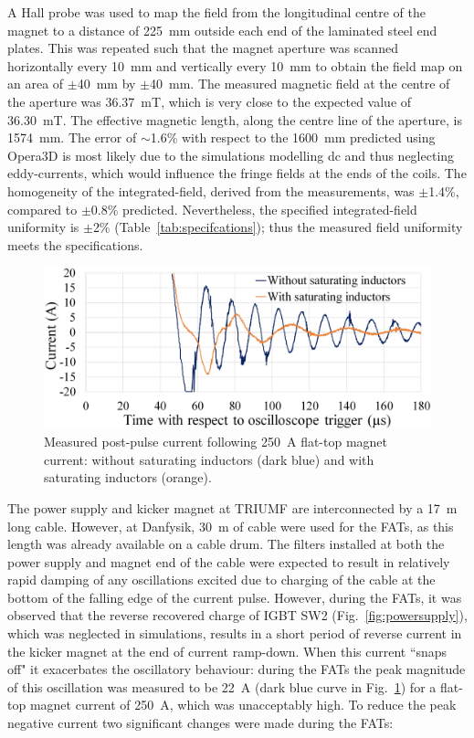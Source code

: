 \documentclass[aps,prab,twocolumn,superscriptaddress]{revtex4-1}
\begin{document}
A Hall probe was used to map the field from the longitudinal centre of the magnet to a distance of 225~mm outside each end of the laminated steel end plates. This was repeated such that the magnet aperture was scanned horizontally every 10~mm and vertically every 10~mm to obtain the field map on an area of $\pm$40~mm  by $\pm$40~mm. The measured magnetic field at the centre of the aperture was 36.37~mT, which is very close to the expected value of 36.30~mT. The effective magnetic length, along the centre line of the aperture, is 1574~mm. The error of $\sim$1.6\% with respect to the 1600~mm predicted using Opera3D is most likely due to the simulations modelling dc and thus neglecting eddy-currents, which would influence the fringe fields at the ends of the coils.
The homogeneity of the integrated-field, derived from the measurements, was $\pm$1.4\%, compared to $\pm$0.8\% predicted. Nevertheless, the specified integrated-field uniformity is $\pm$2\% (Table~\ref{tab:specifcations}); thus the measured field uniformity meets the specifications. 

\begin{figure}[b]
	\includegraphics[width=\linewidth]{initial-undershoot-smaller.png} %
	\caption{Measured post-pulse current following 250~A flat-top magnet current: without saturating inductors (dark blue) and with saturating inductors (orange).}
	\label{fig:initialundershoot}
\end{figure}
The power supply and kicker magnet at TRIUMF are interconnected by a 17~m long cable. However, at Danfysik, 30~m of cable were used for the FATs, as this length was already available on a cable drum. The filters installed at both the power supply and magnet end of the cable were expected to result in relatively rapid damping of any  oscillations excited due to charging of the cable at the bottom of the falling edge of the current pulse. However, during the FATs, it was observed that the reverse recovered charge of IGBT SW2 (Fig.~\ref{fig:powersupply}), which was neglected in simulations, results in a short period of reverse current in the kicker magnet at the end of current ramp-down. When this current ``snaps off" it exacerbates the oscillatory behaviour: during the FATs  the peak magnitude of this oscillation was measured to be 22~A (dark blue curve in Fig.~\ref{fig:initialundershoot}) for a flat-top magnet current of 250~A, which was unacceptably high. To reduce the peak negative current two significant changes were made during the FATs:
\end{document}
